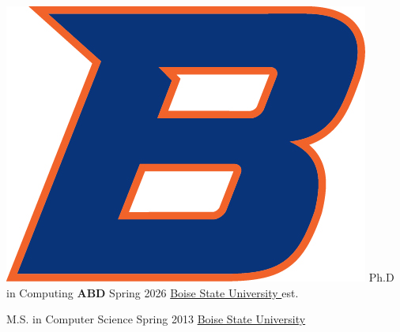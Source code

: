 \documentclass{shanep}
\begin{document}

\begin{itemize}

  \ressubheading
      {\includegraphics[scale=.3]{bsu.jpg}}
      {Ph.D in Computing \textbf{ABD}}
      {Spring 2026}
      {\href{http://www.boisestate.edu}{Boise State University }}
      {est.}
      {}

      \ressubheading
          {}
          {M.S. in Computer Science}
	  {Spring 2013}
	  {\href{http://www.boisestate.edu}{Boise State University }}
	  {}
	  {}

\end{itemize} %
\end{document}

